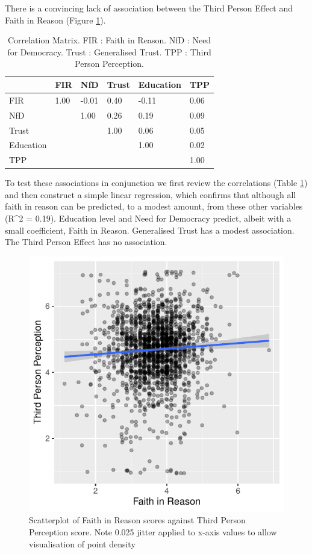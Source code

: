 \documentclass[
  ,jou,floatsintext]{apa6}
\begin{document}
There is a convincing lack of association between the Third Person Effect and Faith in Reason (Figure \ref{fig:tpe}).

\begin{table}

\caption{\label{tab:cortable}Correlation Matrix. FIR : Faith in Reason. NfD : Need for Democracy. Trust : Generalised Trust. TPP : Third Person Perception.}
\centering
\begin{tabular}[t]{l|l|l|l|l|l}
\hline
  & FIR  & NfD  & Trust  & Education  & TPP \\
\hline
FIR & 1.00 & -0.01 & 0.40 & -0.11 & 0.06\\
\hline
NfD &  & 1.00 & 0.26 & 0.19 & 0.09\\
\hline
Trust &  &  & 1.00 & 0.06 & 0.05\\
\hline
Education &  &  &  & 1.00 & 0.02\\
\hline
TPP &  &  &  &  & 1.00\\
\hline
\end{tabular}
\end{table}

To test these associations in conjunction we first review the correlations (Table \ref{tab:cortable}) and then construct a simple linear regression, which confirms that although all faith in reason can be predicted, to a modest amount, from these other variables (R\^{}2 = 0.19). Education level and Need for Democracy predict, albeit with a small coefficient, Faith in Reason. Generalised Trust has a modest association. The Third Person Effect has no association.

\begin{figure}

{\centering \includegraphics[width=0.75\linewidth]{faithinreason_files/figure-latex/tpe-1} 

}

\caption{Scatterplot of Faith in Reason scores against Third Person Perception score. Note 0.025 jitter applied to x-axis values to allow visualisation of point density}\label{fig:tpe}
\end{figure}
\end{document}
